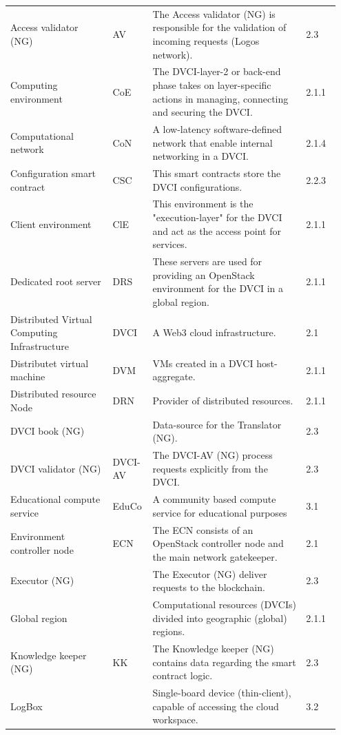 \documentclass[]{article}
\begin{document}
\begin{longtable}{p{0.3\linewidth} p{0.1\linewidth} p{0.45\linewidth} p{0.1\linewidth}}
Access validator (NG) & AV & The Access validator (NG) is responsible for the validation of incoming requests (Logos network). & 2.3 \\ %
Computing environment & CoE & The DVCI-layer-2 or back-end phase takes on layer-specific actions in managing, connecting and securing the DVCI. & 2.1.1 \\ %
Computational network & CoN & A low-latency software-defined network that enable internal networking in a DVCI. & 2.1.4 \\ %
Configuration smart contract & CSC & This smart contracts store the DVCI configurations. & 2.2.3 \\ %
Client environment & ClE & This environment is the "execution-layer" for the DVCI and act as the access point for services. & 2.1.1 \\ %
Dedicated root server & DRS & These servers are used for providing an OpenStack environment for the DVCI in a global region. & 2.1.1 \\ %
Distributed Virtual \newline Computing Infrastructure & DVCI & A Web3 cloud infrastructure. & 2.1 \\ %
Distributet virtual machine & DVM & VMs created in a DVCI host-aggregate. & 2.1.1 \\ %
Distributed resource Node & DRN & Provider of distributed resources.  & 2.1.1 \\ %
DVCI book (NG) & & Data-source for the Translator (NG). & 2.3 \\ %
DVCI validator (NG) & DVCI-AV & The DVCI-AV (NG) process requests explicitly from the DVCI. & 2.3 \\ %
Educational compute service & EduCo & A community based compute service for educational purposes & 3.1 \\ %
Environment controller node & ECN & The ECN consists of an OpenStack controller node and the main network gatekeeper. & 2.1 \\ %
Executor (NG) & & The Executor (NG) deliver requests to the blockchain. & 2.3 \\ %
Global region & & Computational resources (DVCIs) divided into geographic (global) regions. & 2.1.1 \\ %
Knowledge keeper (NG) & KK & The Knowledge keeper (NG) contains data regarding the smart contract logic. & 2.3 \\ %
LogBox & & Single-board device (thin-client), capable of accessing the cloud workspace. & 3.2 \\ %

\end{longtable}
\end{document}
